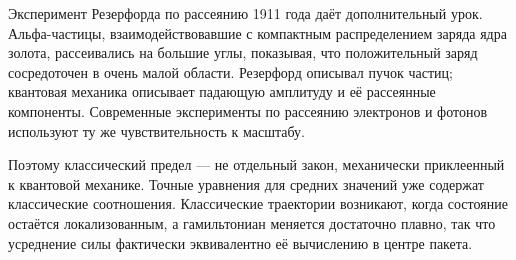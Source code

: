\begin{classroomqa}
\end{classroomqa}

Эксперимент Резерфорда по рассеянию 1911 года даёт дополнительный урок. Альфа-частицы, взаимодействовавшие с компактным распределением заряда ядра золота, рассеивались на большие углы, показывая, что положительный заряд сосредоточен в очень малой области. Резерфорд описывал пучок частиц; квантовая механика описывает падающую амплитуду и её рассеянные компоненты. Современные эксперименты по рассеянию электронов и фотонов используют ту же чувствительность к масштабу.

\begin{classroomqa}
\end{classroomqa}

Поэтому классический предел — не отдельный закон, механически приклеенный к квантовой механике. Точные уравнения для средних значений уже содержат классические соотношения. Классические траектории возникают, когда состояние остаётся локализованным, а гамильтониан меняется достаточно плавно, так что усреднение силы фактически эквивалентно её вычислению в центре пакета.
